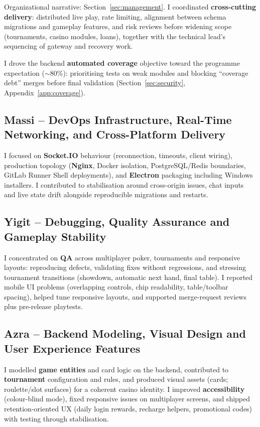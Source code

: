 \documentclass[11pt,a4paper]{article}
\begin{document}
Organizational narrative: Section~\ref{sec:management}. I coordinated \textbf{cross-cutting delivery}: distributed live play, rate limiting, alignment between schema migrations and gameplay features, and risk reviews before widening scope (tournaments, casino modules, loans), together with the technical lead's sequencing of gateway and recovery work.

I drove the backend \textbf{automated coverage} objective toward the programme expectation ($\sim$80\%): prioritising tests on weak modules and blocking ``coverage debt'' merges before final validation (Section~\ref{sec:security}, Appendix~\ref{app:coverage}).

\subsection{Massi -- DevOps Infrastructure, Real-Time Networking, and Cross-Platform Delivery}

I focused on \textbf{Socket.IO} behaviour (reconnection, timeouts, client wiring), production topology (\textbf{Nginx}, Docker isolation, PostgreSQL/Redis boundaries, GitLab Runner Shell deployments), and \textbf{Electron} packaging including Windows installers. I contributed to stabilisation around cross-origin issues, chat inputs and live state drift alongside reproducible migrations and restarts.

\subsection{Yigit -- Debugging, Quality Assurance and Gameplay Stability}

I concentrated on \textbf{QA} across multiplayer poker, tournaments and responsive layouts: reproducing defects, validating fixes without regressions, and stressing tournament transitions (showdown, automatic next hand, final table). I reported mobile UI problems (overlapping controls, chip readability, table/toolbar spacing), helped tune responsive layouts, and supported merge-request reviews plus pre-release playtests.

\subsection{Azra -- Backend Modeling, Visual Design and User Experience Features}

I modelled \textbf{game entities} and card logic on the backend, contributed to \textbf{tournament} configuration and rules, and produced visual assets (cards; roulette/slot surfaces) for a coherent casino identity. I improved \textbf{accessibility} (colour-blind mode), fixed responsive issues on multiplayer screens, and shipped retention-oriented UX (daily login rewards, recharge helpers, promotional codes) with testing through stabilisation.
\end{document}
